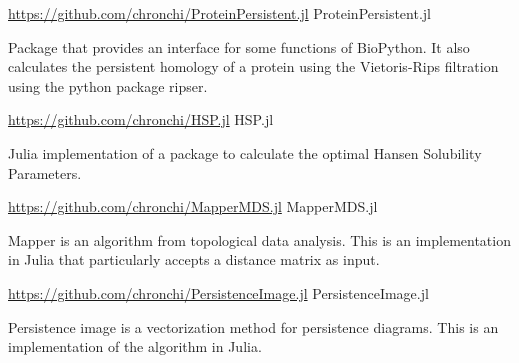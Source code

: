 

\begin{cventries}

\cventry
  {\url{https://github.com/chronchi/ProteinPersistent.jl}} %
  {ProteinPersistent.jl} %
  {}{}
  {
    \begin{cvitems} %
      \item {Package that provides an interface for some functions of BioPython.
      It also calculates the persistent homology of a protein using the
      Vietoris-Rips filtration using the python package ripser.}
    \end{cvitems}
  }

\cventry
  {\url{https://github.com/chronchi/HSP.jl}} %
  {HSP.jl} %
  {}{}
  {
    \begin{cvitems} %
      \item {Julia implementation of a package to calculate the
      optimal Hansen Solubility Parameters.}
    \end{cvitems}
  }

\cventry
  {\url{https://github.com/chronchi/MapperMDS.jl}} %
  {MapperMDS.jl} %
  {}{}
  {
    \begin{cvitems} %
      \item {Mapper is an algorithm from topological data analysis. This is
      an implementation in Julia that particularly accepts a distance matrix
      as input.}
    \end{cvitems}
  }

\cventry
  {\url{https://github.com/chronchi/PersistenceImage.jl}} %
  {PersistenceImage.jl} %
  {}{}
  {
    \begin{cvitems} %
      \item {Persistence image is a vectorization method for persistence
      diagrams. This is an implementation of the algorithm in Julia.}
    \end{cvitems}
  }

\end{cventries}
